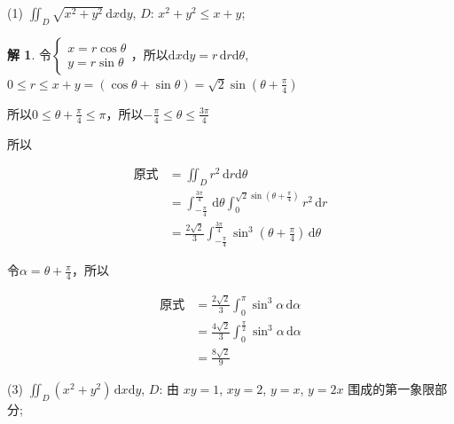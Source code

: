 \documentclass[a4paper,12pt]{article}
\theoremstyle{definition}
\newtheorem*{sol}{解}
\begin{document}
(1) $\displaystyle\iint_{D} \sqrt{x^2 + y^2}\,\mathrm{d}x\mathrm{d}y$, $D$: $x^2 + y^2 \leq x + y$;
\begin{sol}
    令$\begin{cases}
            x=r\cos\theta \\
            y=r\sin\theta
        \end{cases}$，所以$\mathrm{d}x\mathrm{d}y=r\,\mathrm{d}r\mathrm{d}\theta$, $0\leq r\leq x+y=(\cos\theta+\sin\theta)=\sqrt{2}\sin(\theta+\frac{\pi}{4})$

    所以$0\leq\theta+\frac{\pi}{4}\leq\pi$，所以$-\frac{\pi}{4}\leq\theta\leq\frac{3\pi}{4}$

    所以

    \begin{align*}
        \text{原式}
         & =\iint_{D}r^2\,\mathrm{d}r\mathrm{d}\theta                                                                           \\
         & =\int_{-\frac{\pi}{4}}^{\frac{3\pi}{4}}\,\mathrm{d}\theta\int_0^{\sqrt{2}\sin(\theta+\frac{\pi}{4})}r^2\,\mathrm{d}r \\
         & =\frac{2\sqrt{2}}{3}\int_{-\frac{\pi}{4}}^{\frac{3\pi}{4}}\sin^3(\theta+\frac{\pi}{4})\,\mathrm{d}\theta
    \end{align*}

    令$\alpha=\theta+\frac{\pi}{4}$，所以

    \begin{align*}
        \text{原式}
         & =\frac{2\sqrt{2}}{3}\int_0^{\pi}\sin^3\alpha\,\mathrm{d}\alpha           \\
         & =\frac{4\sqrt{2}}{3}\int_0^{\frac{\pi}{2}}\sin^3\alpha\,\mathrm{d}\alpha \\
         & =\frac{8\sqrt{2}}{9}
    \end{align*}
\end{sol}
(3) $\displaystyle\iint_{D} (x^2 + y^2)\,\mathrm{d}x\mathrm{d}y$, $D$: 由 $xy=1$, $xy=2$, $y=x$, $y=2x$ 围成的第一象限部分;
\end{document}
